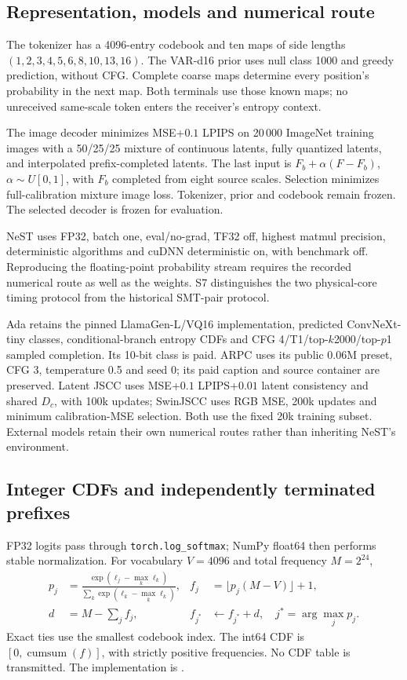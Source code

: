 \documentclass[10pt,letterpaper]{article}
\begin{document}
\subsection{Representation, models and numerical route}
The tokenizer has a 4096-entry codebook and ten maps of side lengths $(1,2,3,4,5,6,8,10,13,16)$. The VAR-d16 prior uses null class 1000 and greedy prediction, without CFG. Complete coarse maps determine every position's probability in the next map. Both terminals use those known maps; no unreceived same-scale token enters the receiver's entropy context.

The image decoder minimizes MSE+$0.1$ LPIPS on 20\,000 ImageNet training images with a 50/25/25 mixture of continuous latents, fully quantized latents, and interpolated prefix-completed latents. The last input is $F_b+\alpha(F-F_b)$, $\alpha\sim U[0,1]$, with $F_b$ completed from eight source scales. Selection minimizes full-calibration mixture image loss. Tokenizer, prior and codebook remain frozen. The selected decoder is frozen for evaluation.

NeST uses FP32, batch one, eval/no-grad, TF32 off, highest matmul precision, deterministic algorithms and cuDNN deterministic on, with benchmark off. Reproducing the floating-point probability stream requires the recorded numerical route as well as the weights. S7 distinguishes the two physical-core timing protocol from the historical SMT-pair protocol.

Ada retains the pinned LlamaGen-L/VQ16 implementation, predicted ConvNeXt-tiny classes, conditional-branch entropy CDFs and CFG 4/T1/top-$k$2000/top-$p$1 sampled completion. Its 10-bit class is paid. ARPC uses its public 0.06M preset, CFG 3, temperature 0.5 and seed 0; its paid caption and source container are preserved. Latent JSCC uses MSE+$0.1$ LPIPS+$0.01$ latent consistency and shared $D_c$, with 100k updates; SwinJSCC uses RGB MSE, 200k updates and minimum calibration-MSE selection. Both use the fixed 20k training subset. External models retain their own numerical routes rather than inheriting NeST's environment.



\subsection{Integer CDFs and independently terminated prefixes}
FP32 logits pass through \texttt{torch.log\_softmax}; NumPy float64 then performs stable normalization. For vocabulary $V=4096$ and total frequency $M=2^{24}$,
\begin{align*}
p_j&=\frac{\exp(\ell_j-\max_k\ell_k)}{\sum_k\exp(\ell_k-\max_k\ell_k)},&
f_j&=\lfloor p_j(M-V)\rfloor+1,\\
d&=M-\sum_j f_j,&f_{j^*}&\leftarrow f_{j^*}+d,\quad j^*=\arg\max_jp_j.
\end{align*}
Exact ties use the smallest codebook index. The int64 CDF is $[0,\operatorname{cumsum}(f)]$, with strictly positive frequencies. No CDF table is transmitted. The implementation is .
\end{document}
